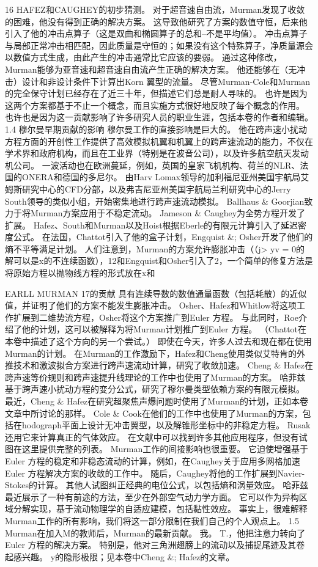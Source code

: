 \documentclass[UTF8,11pt,a4paper,openany,fontset=fandol]{ctexbook}
\begin{document}
16 HAFEZ和CAUGHEY的初步猜测。 对于超音速自由流，Murman发现了收敛的困难，他没有得到正确的解决方案。 这导致他研究了方案的数值守恒，后来他引入了他的冲击点算子（这是双曲和椭圆算子的总和--不是平均值）。 冲击点算子与局部正常冲击相匹配，因此质量是守恒的；如果没有这个特殊算子，净质量源会以数值方式生成，由此产生的冲击通常比它应该的要弱。 通过这种修改，Murman能够为亚音速和超音速自由流产生正确的解决方案。 他还能够在（无冲击）设计和非设计条件下计算出Korn 翼型的流量。 尽管Murman-Cole和Murman的完全保守计划已经存在了近三十年，但描述它们总是耐人寻味的。 也许是因为这两个方案都基于不止一个概念，而且实施方式很好地反映了每个概念的作用。 也许也是因为这一贡献影响了许多研究人员的职业生涯，包括本卷的作者和编辑。 1.4 穆尔曼早期贡献的影响 穆尔曼工作的直接影响是巨大的。 他在跨声速小扰动方程方面的开创性工作提供了高效模拟机翼和机翼上的跨声速流动的能力，不仅在学术界和政府机构，而且在工业界（特别是在波音公司），以及许多航空航天发动机公司。 一波活动也在欧洲蔓延，例如，英国的皇家飞机机构、荷兰的NLR、法国的ONERA和德国的多尼尔。 由Harv Lomax领导的加利福尼亚州美国宇航局艾姆斯研究中心的CFD分部，以及弗吉尼亚州美国宇航局兰利研究中心的Jerry South领导的类似小组，开始密集地进行跨声速流动模拟。 Ballhaus \& Goorjian致力于将Murman方案应用于不稳定流动。 Jameson \& Caughey为全势方程开发了扩展。 Hafez、South和Murman以及Hoist根据Eberle的有限元计算引入了延迟密度公式。 在法国，Chattot引入了他的盒子计划，Engquist \&; Osher开发了他们的熵不平等满足计划。 人们注意到，Murman的方案允许膨胀冲击（（j> yv = 0的解可以是x的不连续函数），12和Engquist和Osher引入了2，一个简单的修复方法是将原始方程以抛物线方程的形式放在x和

EARLL MURMAN 17的贡献 具有连续导数的数值通量函数（包括耗散）的近似值，并证明了他们的方案不能发生膨胀冲击。 Osher、Hafez和Whitlow将这项工作扩展到二维势流方程，Osher将这个方案推广到Euler 方程。 与此同时，Roe介绍了他的计划，这可以被解释为将Murman计划推广到Euler 方程。 （Chattot在本卷中描述了这个方向的另一个尝试。） 即使在今天，许多人过去和现在都在使用Murman的计划。 在Murman的工作激励下，Hafez和Cheng使用类似艾特肯的外推技术和激波拟合方案进行跨声速流动计算，研究了收敛加速。 Cheng \& Hafez在跨声速等价规则和跨声速提升线理论的工作中也使用了Murman的方案。 哈菲兹基于跨声速小扰动方程的变分公式，研究了穆尔曼类型依赖方案的有限元模拟。 最近，Cheng \& Hafez在研究超聚焦声爆问题时使用了Murman的计划，正如本卷文章中所讨论的那样。 Cole \& Cook在他们的工作中也使用了Murman的方案，包括在hodograph平面上设计无冲击翼型，以及解锥形坐标中的非稳定方程。 Rusak还用它来计算真正的气体效应。 在文献中可以找到许多其他应用程序，但没有试图在这里提供完整的列表。 Murman工作的间接影响也很重要。 它迫使增强基于Euler 方程的稳定和非稳态流动的计算，例如，在Caughey关于应用多网格加速Euler 方程解决方案的收敛的工作中。 随后，Caughey将他的工作扩展到Navier-Stokes的计算。 其他人试图纠正经典的电位公式，以包括熵和涡量效应。 哈菲兹最近展示了一种有前途的方法，至少在外部空气动力学方面。 它可以作为异构区域分解实现，基于流动物理学的自适应建模，包括黏性效应。 事实上，很难解释Murman工作的所有影响，我们将这一部分限制在我们自己的个人观点上。 1.5 Murman在加入M的教师后，Murman的最新贡献。 我。 T.，他把注意力转向了Euler 方程的解决方案。 特别是，他对三角洲翅膀上的流动以及捕捉尾迹及其卷起感兴趣。 y的隐形极限；见本卷中Cheng \&; Hafez的文章。
\end{document}
